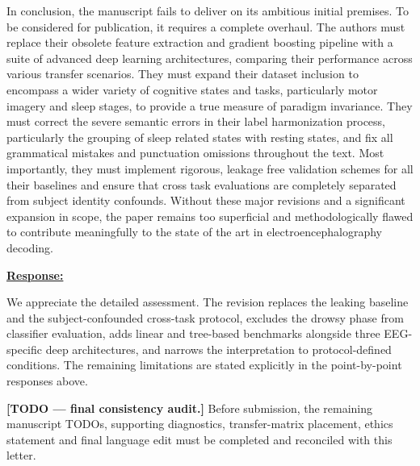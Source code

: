 \documentclass{article}
\begin{document}
\begin{cmt}{}{}

In conclusion, the manuscript fails to deliver on its ambitious initial
premises. To be considered for publication, it requires a complete overhaul. The
authors must replace their obsolete feature extraction and gradient boosting
pipeline with a suite of advanced deep learning architectures, comparing their
performance across various transfer scenarios. They must expand their dataset
inclusion to encompass a wider variety of cognitive states and tasks,
particularly motor imagery and sleep stages, to provide a true measure of
paradigm invariance. They must correct the severe semantic errors in their label
harmonization process, particularly the grouping of sleep related states with
resting states, and fix all grammatical mistakes and punctuation omissions
throughout the text. Most importantly, they must implement rigorous, leakage
free validation schemes for all their baselines and ensure that cross task
evaluations are completely separated from subject identity confounds. Without
these major revisions and a significant expansion in scope, the paper remains
too superficial and methodologically flawed to contribute meaningfully to the
state of the art in electroencephalography decoding.

\end{cmt}
\vspace{0.1cm}
\noindent
\underline{\textbf{Response:}}
\vspace{0.2cm}

We appreciate the detailed assessment. The revision replaces the leaking
baseline and the subject-confounded cross-task protocol, excludes the drowsy
phase from classifier evaluation, adds linear and tree-based benchmarks alongside
three EEG-specific deep architectures, and narrows the interpretation to
protocol-defined conditions. The remaining limitations are stated explicitly in
the point-by-point responses above.

\textbf{[TODO --- final consistency audit.]}
Before submission, the remaining manuscript TODOs, supporting diagnostics,
transfer-matrix placement, ethics statement and final language edit must be
completed and reconciled with this letter.

\vspace{0.3cm}
\end{document}
